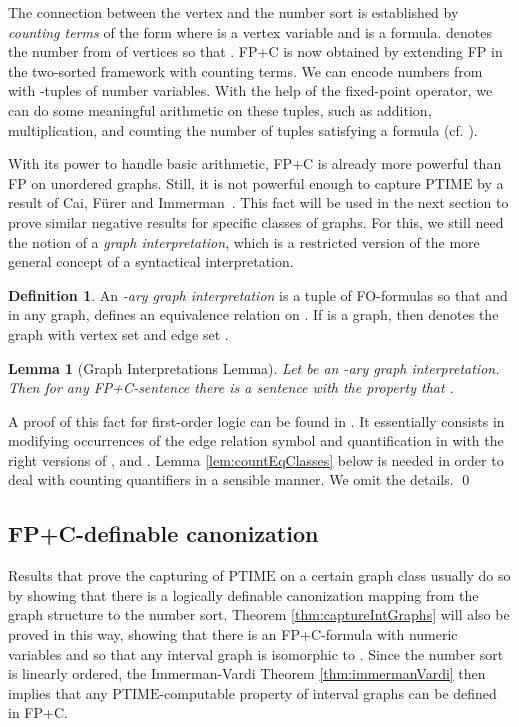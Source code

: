 \documentclass[10pt]{article}
\newtheorem{lem}[thm]{Lemma}
\theoremstyle{remark}
\theoremstyle{definition}
\newtheorem{definition}[thm]{Definition}
\theoremstyle{plain}
\newcommand{\logic}[1]{\textsf{\upshape\relsize{-0.5}#1}\xspace}
\newcommand{\FP}{\logic{FP}}
\newcommand{\FPC}{\logic{FP+C}}
\newcommand{\FOL}{\logic{FO}}
\newcommand{\cclass}[1]{\ensuremath{\mathrm{#1}}\xspace}
\newcommand{\PTIME}{\cclass{PTIME}}
\begin{document}
The connection between the vertex and the number sort is established by \emph{counting terms} of the form  where  is a vertex variable and  is a formula.  denotes the number from  of vertices  so that . \FPC is now obtained by extending \FP in the two-sorted framework with counting terms. 
We can encode numbers from  with -tuples of number variables. With the help of the fixed-point operator, we can do some meaningful arithmetic on these tuples, such as addition, multiplication, and counting the number of tuples  satisfying a formula  (cf. \cite{graedel07finite}).

With its power to handle basic arithmetic, \FPC is already more powerful than \FP on unordered graphs. Still, it is not powerful enough to capture \PTIME by a result of Cai, F\"urer and Immerman~\cite{cai92optimal}. This fact will be used in the next section to prove similar negative results for specific classes of graphs. For this, we still need the notion of a \emph{graph interpretation}, which is a restricted version of the more general concept of a syntactical interpretation.

\begin{definition}\label{def:graphInterpretation}
 An \emph{-ary graph interpretation} is a tuple  of \FOL-formulas so that  and in any graph,  defines an equivalence relation on . If  is a graph, then  denotes the graph with vertex set  and edge set .
\end{definition}


\begin{lem}[Graph Interpretations Lemma]\label{lem:graphInterpretationsLemma}
 Let  be an -ary graph interpretation. Then for any \FPC-sentence  there is a sentence  with the property that .
\end{lem}

\proof[Idea.] A proof of this fact for first-order logic can be found in \cite{ebbinghaus94mathematical}. It essentially consists in modifying occurrences of the edge relation symbol and quantification in  with the right versions of ,  and . Lemma \ref{lem:countEqClasses} below is needed in order to deal with counting quantifiers in a sensible manner. We omit the details. \qed


\subsection{\FPC-definable canonization}

Results that prove the capturing of \PTIME on a certain graph class usually do so by showing that there is a logically definable canonization mapping from the graph structure to the number sort. Theorem \ref{thm:captureIntGraphs} will also be proved in this way, showing that there is an \FPC-formula  with numeric variables  and  so that any interval graph  is isomorphic to . Since the number sort  is linearly ordered, the Immerman-Vardi Theorem \ref{thm:immermanVardi} then implies that any \PTIME-computable property of interval graphs can be defined in \FPC.
\end{document}
